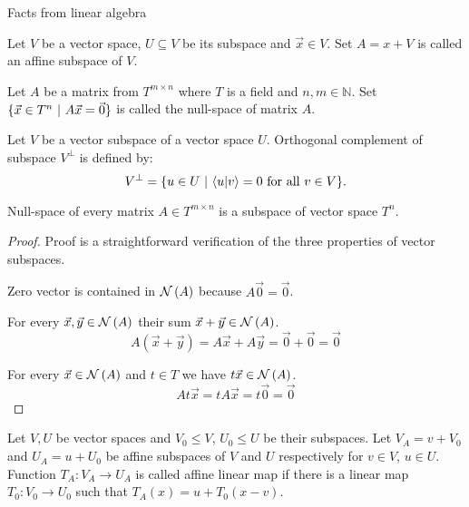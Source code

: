 \begin{chapter}{Facts from linear algebra}
\begin{definition}
Let $V$ be a vector space, $U \subseteq V$ be its subspace and $\vec{x} \in V$. Set $A = x + V$ is called an affine subspace of $V$.
\end{definition}

\begin{definition}
Let $A$ be a matrix from $T ^ {m \times n}$ where $T$ is a field and $n, m \in \mathbb{N}$. Set $\{ \vec{x} \in T^{n} \ | \  A\vec{x} = \vec{0} \}$ is called the null-space of matrix $A$.
\end{definition}

\begin{definition}
Let $V$ be a vector subspace of a vector space $U$. Orthogonal complement of subspace $V ^ {\bot}$ is defined by:
\[
	V ^ {\bot} = \{ u \in U \ | \  \langle u | v \rangle = 0 \text{ for all } v \in V \} \text{.}
\]
\end{definition}

\begin{remark}
Null-space of every matrix $A \in T ^ {m \times n}$ is a subspace of vector space $T^{n}$.
\end{remark}
\begin{proof}
Proof is a straightforward verification of the three properties of vector subspaces.

Zero vector is contained in $\mathcal{N}\left({A}\right)$ because $A\vec{0} = \vec{0}$.

For every $\vec{x}, \vec{y} \in \mathcal{N}\left({A}\right)$ their sum $\vec{x} + \vec{y} \in \mathcal{N}\left({A}\right)$.
\[
	A(\vec{x} + \vec{y}) = A\vec{x} + A\vec{y} = \vec{0} + \vec{0} = \vec{0}
\]

For every $\vec{x} \in \mathcal{N}\left({A}\right)$ and $t \in T$ we have $t \vec{x} \in \mathcal{N}\left({A}\right)$.
\[
	At\vec{x} = tA\vec{x} = t\vec{0} = \vec{0}
\]
\end{proof}

\begin{definition}
Let $V, U$ be vector spaces and $V_0 \leq V$, $U_0 \leq U$ be their subspaces. Let $V_A = v + V_0$ and $U_A = u + U_0$ be affine subspaces of $V$ and $U$ respectively for $v \in V$, $u \in U$. Function $T_A: V_A \rightarrow U_A$ is called affine linear map if there is a linear map $T_0: V_0 \rightarrow U_0$ such that $T_A(x) = u + T_0(x - v)$.
\end{definition}


\end{chapter}
